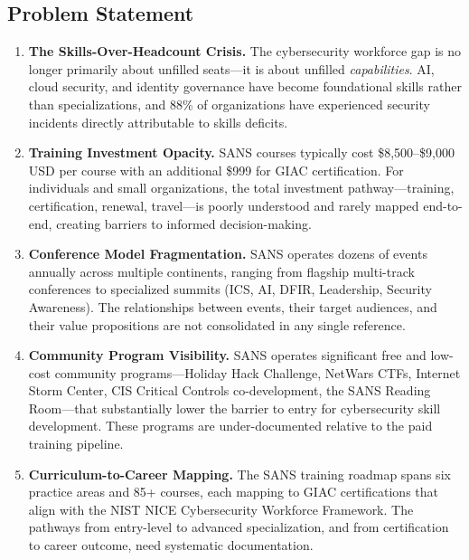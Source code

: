 \documentclass[11pt,letterpaper]{article}
\begin{document}
\subsection{Problem Statement}

\begin{enumerate}[label=\textbf{\arabic*.}]
  \item \textbf{The Skills-Over-Headcount Crisis.} The cybersecurity workforce gap is no longer primarily about unfilled seats---it is about unfilled \emph{capabilities}. AI, cloud security, and identity governance have become foundational skills rather than specializations, and 88\% of organizations have experienced security incidents directly attributable to skills deficits.

  \item \textbf{Training Investment Opacity.} SANS courses typically cost \$8,500--\$9,000 USD per course with an additional \$999 for GIAC certification. For individuals and small organizations, the total investment pathway---training, certification, renewal, travel---is poorly understood and rarely mapped end-to-end, creating barriers to informed decision-making.

  \item \textbf{Conference Model Fragmentation.} SANS operates dozens of events annually across multiple continents, ranging from flagship multi-track conferences to specialized summits (ICS, AI, DFIR, Leadership, Security Awareness). The relationships between events, their target audiences, and their value propositions are not consolidated in any single reference.

  \item \textbf{Community Program Visibility.} SANS operates significant free and low-cost community programs---Holiday Hack Challenge, NetWars CTFs, Internet Storm Center, CIS Critical Controls co-development, the SANS Reading Room---that substantially lower the barrier to entry for cybersecurity skill development. These programs are under-documented relative to the paid training pipeline.

  \item \textbf{Curriculum-to-Career Mapping.} The SANS training roadmap spans six practice areas and 85+ courses, each mapping to GIAC certifications that align with the NIST NICE Cybersecurity Workforce Framework. The pathways from entry-level to advanced specialization, and from certification to career outcome, need systematic documentation.
\end{enumerate}
\end{document}
